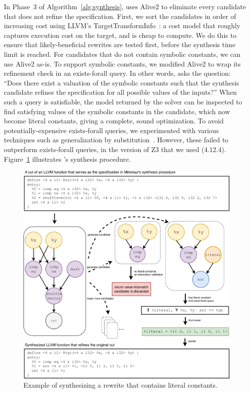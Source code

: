 In Phase~3 of Algorithm~\ref{alg:synthesis}, \minotaur{} uses Alive2 to
eliminate every candidate that does not refine the specification.
%
First, we sort the candidates in order of increasing cost using LLVM's
TargetTransformInfo~\cite{tti}: a cost model that roughly captures
execution cost on the target, and is cheap to compute.
%
We do this to ensure that likely-beneficial rewrites are tested first,
before the synthesis time limit is reached.
%
For candidates that do not contain symbolic constants, we can use
Alive2 as-is.
%
To support symbolic constants, we modified Alive2 to wrap
its refinement check in an exists-forall query.
%
In other words, \minotaur{} asks the question: ``Does there exist a
valuation of the symbolic constants such that the synthesis candidate
refines the specification for all possible values of the inputs?''
%
When such a query is satisfiable, the model returned by the solver can
be inspected to find satisfying values of the symbolic constants
in the candidate, which now become literal constants, giving a
complete, sound optimization.
%
To avoid potentially-expensive exists-forall queries, we experimented
with various techniques such as generalization by
substitution~\cite{Dutertre15}.
%
However, these failed to outperform exists-forall queries, in the
version of Z3 that we used (4.12.4).
%
Figure~\ref{fig:synthesizing} illustrates \minotaur's synthesis procedure.
\begin {figure}[bp]
  \centering
  \includegraphics[width=0.9\linewidth]{figures/solve_literal.pdf}
  \caption{Example of synthesizing a rewrite that contains literal constants.}
  \label{fig:synthesizing}
\end{figure}

